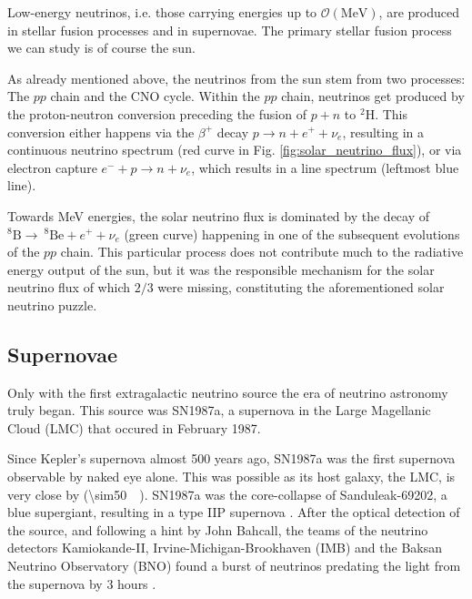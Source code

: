 \documentclass[
    a4paper, %
    fontsize=10pt, %
    twoside=false, %
    numbers=noenddot, %
    fontmethod=tex,
]{kaobook}
\begin{document}
Low-energy neutrinos, i.e. those carrying energies up to $\mathcal{O}(\unit{\mega\eV})$, are produced in stellar fusion processes and in supernovae. The primary stellar fusion process we can study is of course the sun.

As already mentioned above, the neutrinos from the sun stem from two processes: The $pp$ chain and the CNO cycle. Within the $pp$ chain, neutrinos get produced by the proton-neutron conversion preceding the fusion of $p+n$ to $^2 \text{H}$. This conversion either happens via the $\beta^+$ decay $p \rightarrow n + e^+ + \nu_e$, resulting in a continuous neutrino spectrum (red curve in Fig. \ref{fig:solar_neutrino_flux}), or via electron capture $e^- + p \rightarrow n + \nu_e$, which results in a line spectrum (leftmost blue line).

Towards \unit{\mega\eV} energies, the solar neutrino flux is dominated by the decay of $^8\text{B}\rightarrow ~^8\text{Be} + e^+ + \nu_e$ (green curve) happening in one of the subsequent evolutions of the $pp$ chain. This particular process does not contribute much to the radiative energy output of the sun, but it was the responsible mechanism for the solar neutrino flux of which $2/3$ were missing, constituting the aforementioned solar neutrino puzzle.

\subsection{Supernovae} \label{sne}
Only with the first extragalactic neutrino source the era of neutrino astronomy truly began. This source was SN1987a, a supernova in the Large Magellanic Cloud (LMC) that occured in February 1987.

Since Kepler's supernova almost 500 years ago, SN1987a was the first supernova observable by naked eye alone. This was possible as its host galaxy, the LMC, is very close by (\SI{\sim50}{\kilo\parsec}). SN1987a was the core-collapse of Sanduleak-69202, a blue supergiant, resulting in a type IIP supernova . After the optical detection of the source, and following a hint by John Bahcall, the teams of the neutrino detectors Kamiokande-II, Irvine-Michigan-Brookhaven (IMB) and the Baksan Neutrino Observatory (BNO) found a burst of neutrinos predating the light from the supernova by 3 hours .
\end{document}
